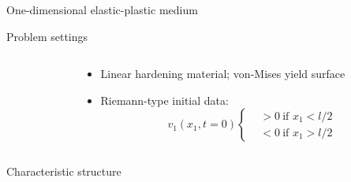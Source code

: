 
\begin{frame}{One-dimensional elastic-plastic medium}
  \begin{block}{\footnotesize Problem settings}
    \vspace{-0.2cm}
    \begin{columns}
      \begin{column}{0.49\textwidth}
        \centering
        
      \end{column}
      \begin{column}{0.49\textwidth}
        \begin{footnotesize}
          \begin{itemize}
          \item Linear hardening material; von-Mises yield surface
          \item Riemann-type initial data:
            \begin{equation*}
              v_1(x_1,t=0) \left\lbrace
                \begin{aligned}
                  &>0 \: \text{if } x_1<l/2\\
                  &<0 \: \text{if } x_1>l/2
                \end{aligned}\right.
            \end{equation*}
          \end{itemize}
        \end{footnotesize}
      \end{column}
    \end{columns}
  \end{block}
  \begin{block}{\footnotesize Characteristic structure \cite{Wang}}
    \begin{columns}
      \begin{column}{0.49\textwidth}
\end{column}
\end{columns}
\end{block}
\end{frame}
